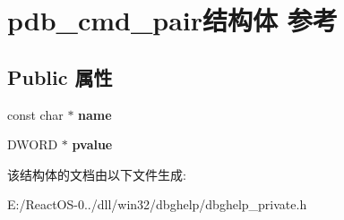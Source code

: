 \hypertarget{structpdb__cmd__pair}{}\section{pdb\+\_\+cmd\+\_\+pair结构体 参考}
\label{structpdb__cmd__pair}
\subsection*{Public 属性}
\begin{DoxyCompactItemize}
\item 
\mbox{\label{structpdb__cmd__pair_a13e896d5417c5489dc9258f819d95855}} 
const char $\ast$ {\bfseries name}
\item 
\mbox{\label{structpdb__cmd__pair_a2e1c75d641f84f7d2cbe126ba596013a}} 
D\+W\+O\+RD $\ast$ {\bfseries pvalue}
\end{DoxyCompactItemize}


该结构体的文档由以下文件生成\+:\begin{DoxyCompactItemize}
\item 
E\+:/\+React\+O\+S-\/0../dll/win32/dbghelp/dbghelp\+\_\+private.\+h\end{DoxyCompactItemize}

